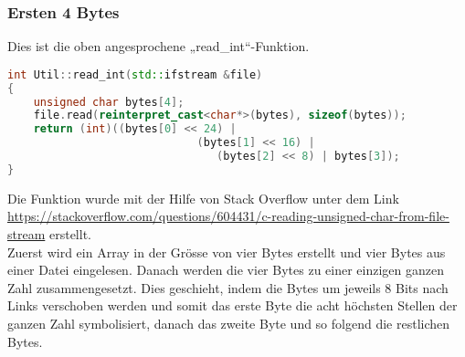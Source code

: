 \subsubsection{Ersten 4 Bytes}
\label{sec:RealErsten4BytesCode}
Dies ist die oben angesprochene „read\_int“-Funktion.
\begin{lstlisting}[language=c++]
int Util::read_int(std::ifstream &file) 
{
	unsigned char bytes[4];
	file.read(reinterpret_cast<char*>(bytes), sizeof(bytes));
	return (int)((bytes[0] << 24) | 
							 (bytes[1] << 16) | 
								(bytes[2] << 8) | bytes[3]);
}
\end{lstlisting}
Die Funktion wurde mit der Hilfe von Stack Overflow unter dem Link \url{https://stackoverflow.com/questions/604431/c-reading-unsigned-char-from-file-stream} erstellt.
\\
Zuerst wird ein Array in der Grösse von vier Bytes erstellt und vier Bytes aus einer Datei eingelesen. Danach werden die vier Bytes zu einer einzigen ganzen Zahl zusammengesetzt. Dies geschieht, indem die Bytes um jeweils 8 Bits nach Links verschoben werden und somit das erste Byte die acht höchsten Stellen der ganzen Zahl symbolisiert, danach das zweite Byte und so folgend die restlichen Bytes.
